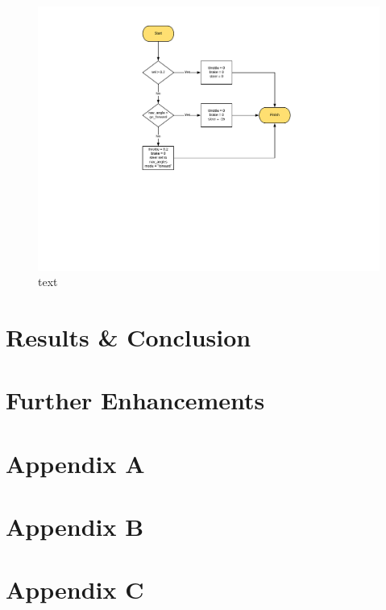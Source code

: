 \documentclass[a4paper]{article}
\begin{document}
\begin{figure}
\hspace{-1cm}
\includegraphics[scale=0.6]{stop_flow}
\caption{text}
\end{figure}

\clearpage

\section{Results \& Conclusion}

\section{Further Enhancements}

\section{Appendix A}
\section{Appendix B}
\section{Appendix C}
\end{document}
